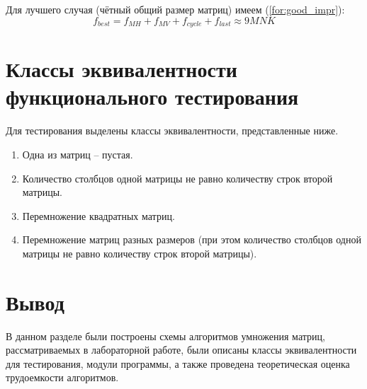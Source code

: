 Для лучшего случая (чётный общий размер матриц) имеем (\ref{for:good_impr}):
\begin{equation}
	\label{for:good_impr}
	f_{best} = f_{MH} + f_{MV} + f_{cycle} + f_{last} \approx 9MNK
\end{equation}


\section{Классы эквивалентности функционального тестирования}

Для тестирования выделены классы эквивалентности, представленные ниже.

\begin{enumerate}
	\item Одна из матриц -- пустая.
	\item Количество столбцов одной матрицы не равно количеству строк второй матрицы.
	\item Перемножение квадратных матриц.
	\item Перемножение матриц разных размеров (при этом количество столбцов одной матрицы не равно количеству строк второй матрицы).
\end{enumerate}


\section{Вывод}

В данном разделе были построены схемы алгоритмов умножения матриц, рассматриваемых в лабораторной работе, были описаны классы эквивалентности для тестирования, модули программы, а также проведена теоретическая оценка трудоемкости алгоритмов.
